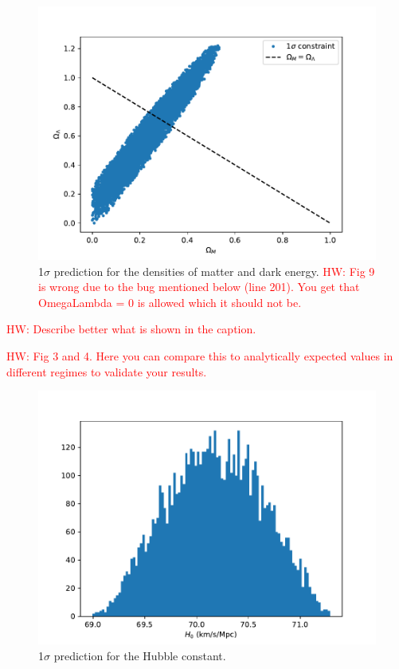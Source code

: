 \documentclass{aa}
\newcommand{\hw}[1]{\textcolor{red}{HW: #1}}
\begin{document}
\begin{figure}[ht]
\centering
\includegraphics[width=\hsize]{figures/fitting.pdf}
  \caption{1$\sigma$ prediction for the densities of matter and dark energy. \hw{Fig 9 is wrong due to the bug mentioned below (line 201). You get that OmegaLambda = 0 is allowed which it should not be.}}
     \label{fig:fitting}
\end{figure}

\hw{Describe better what is shown in the caption.}

\hw{Fig 3 and 4. Here you can compare this to analytically expected values in different regimes to validate your results.}

\begin{figure}[ht]
\centering
\includegraphics[width=\hsize]{figures/histogram.pdf}
  \caption{1$\sigma$ prediction for the Hubble constant.}
     \label{fit:hist}
\end{figure}
\end{document}
